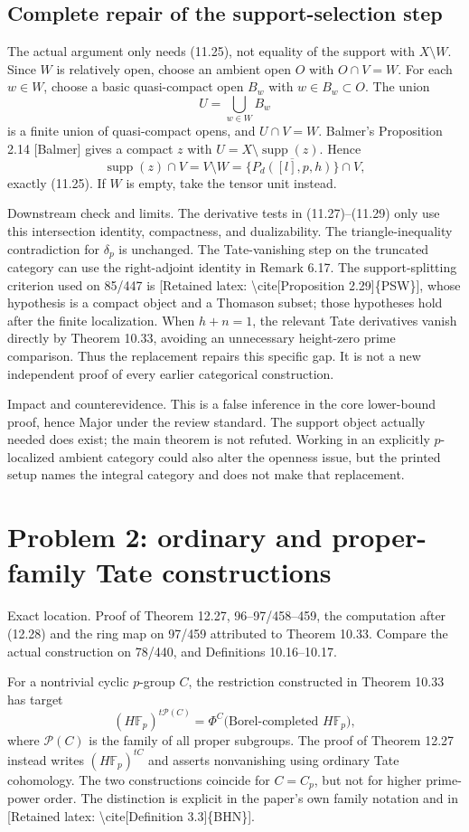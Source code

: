 \documentclass[10pt]{article}
\begin{document}
\subsection*{Complete repair of the support-selection step}
The actual argument only needs (11.25), not equality of the support with \(X\setminus W\). Since \(W\) is relatively open, choose an ambient open \(O\) with \(O\cap V=W\). For each \(w\in W\), choose a basic quasi-compact open \(B_w\) with \(w\in B_w\subset O\). The union \[U=\bigcup_{w\in W}B_w\] is a finite union of quasi-compact opens, and \(U\cap V=W\). Balmer’s Proposition 2.14 [Balmer] gives a compact \(z\) with \(U=X\setminus\operatorname{supp}(z)\). Hence \[\operatorname{supp}(z)\cap V=V\setminus W
 =\overline{\{P_d([l],p,h)\}}\cap V,\] exactly (11.25). If \(W\) is empty, take the tensor unit instead.\par
Downstream check and limits. The derivative tests in (11.27)–(11.29) only use this intersection identity, compactness, and dualizability. The triangle-inequality contradiction for \(\delta_p\) is unchanged. The Tate-vanishing step on the truncated category can use the right-adjoint identity in Remark 6.17. The support-splitting criterion used on 85/447 is [Retained latex: \textbackslash{}cite[Proposition 2.29]\{PSW\}], whose hypothesis is a compact object and a Thomason subset; those hypotheses hold after the finite localization. When \(h+n=1\), the relevant Tate derivatives vanish directly by Theorem 10.33, avoiding an unnecessary height-zero prime comparison. Thus the replacement repairs this specific gap. It is not a new independent proof of every earlier categorical construction.\par
Impact and counterevidence. This is a false inference in the core lower-bound proof, hence Major under the review standard. The support object actually needed does exist; the main theorem is not refuted. Working in an explicitly \(p\)-localized ambient category could also alter the openness issue, but the printed setup names the integral category and does not make that replacement.\par
\section*{Problem 2: ordinary and proper-family Tate constructions}
Exact location. Proof of Theorem 12.27, 96–97/458–459, the computation after (12.28) and the ring map on 97/459 attributed to Theorem 10.33. Compare the actual construction on 78/440, and Definitions 10.16–10.17.\par
For a nontrivial cyclic \(p\)-group \(C\), the restriction constructed in Theorem 10.33 has target \[(H\mathbb F_p)^{t\mathcal P(C)}
 =\Phi^C\bigl(\text{Borel-completed }H\mathbb F_p\bigr),\] where \(\mathcal P(C)\) is the family of all proper subgroups. The proof of Theorem 12.27 instead writes \((H\mathbb F_p)^{tC}\) and asserts nonvanishing using ordinary Tate cohomology. The two constructions coincide for \(C=C_p\), but not for higher prime-power order. The distinction is explicit in the paper’s own family notation and in [Retained latex: \textbackslash{}cite[Definition 3.3]\{BHN\}].\par
\end{document}
